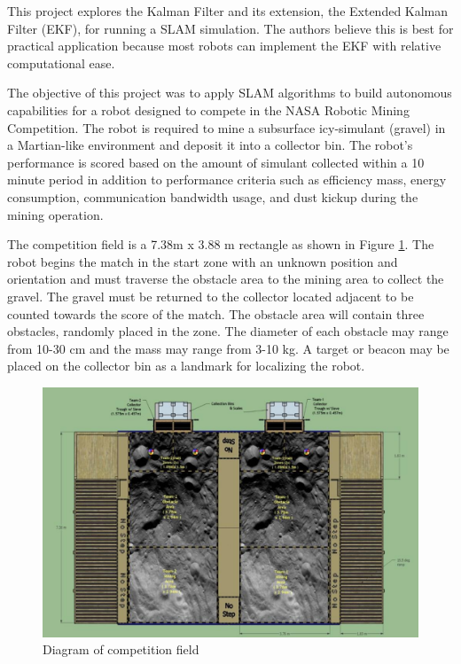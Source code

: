 \documentclass[journal]{IEEEtran}
\begin{document}
This project explores the Kalman Filter and its extension, the Extended Kalman Filter (EKF), 
for running a SLAM simulation. The authors believe this is best for practical application 
because most robots can implement the EKF with relative computational ease. 

The objective of this project was to apply SLAM algorithms to build autonomous capabilities 
for a robot designed to compete in the NASA Robotic Mining Competition. The robot is 
required to mine a subsurface icy-simulant (gravel) in a Martian-like environment and deposit 
it into a collector bin. The robot’s performance is scored based on the amount of simulant 
collected within a 10 minute period in addition to performance criteria such as efficiency 
mass, energy consumption, communication bandwidth usage, and dust kickup during the mining 
operation.

The competition field is a 7.38m x 3.88 m rectangle as shown in Figure \ref{fig:playing-field}. 
The robot begins the match in the start zone with an unknown position and orientation and must 
traverse the obstacle area to the mining area to collect the gravel. The gravel must be 
returned to the collector located adjacent to be counted towards the score of the match. The 
obstacle area will contain three obstacles, randomly placed in the zone. The diameter of each 
obstacle may range from 10-30 cm and the mass may range from 3-10 kg. A target or beacon may 
be placed on the collector bin as a landmark for localizing the robot. 

\begin{figure}[!t]%
\centering
\includegraphics[width=0.9\linewidth]{Figures/playing-field.png}
\caption{Diagram of competition field \cite{nasa-rmc-rules}}
\label{fig:playing-field}
\end{figure}
\end{document}
